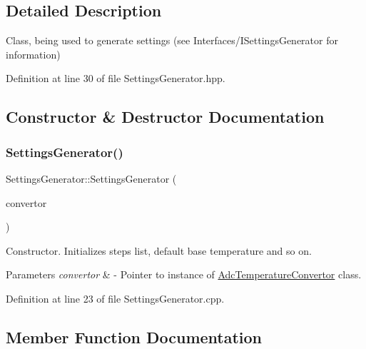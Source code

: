 \subsection{Detailed Description}
Class, being used to generate settings (see Interfaces/\+I\+Settings\+Generator for information) 

Definition at line 30 of file Settings\+Generator.\+hpp.



\subsection{Constructor \& Destructor Documentation}
\mbox{\label{class_settings_generator_a063e189547011b62a567ff55446341d7}} 
\subsubsection{\texorpdfstring{Settings\+Generator()}{SettingsGenerator()}}
{\footnotesize\ttfamily Settings\+Generator\+::\+Settings\+Generator (\begin{DoxyParamCaption}\item[{\hyperlink{class_interfaces_1_1_i_adc_temperature_convertor}{Interfaces\+::\+I\+Adc\+Temperature\+Convertor} $\ast$}]{convertor }\end{DoxyParamCaption})}



Constructor. Initializes steps list, default base temperature and so on. 


\begin{DoxyParams}{Parameters}
{\em convertor} & -\/ Pointer to instance of \hyperlink{class_adc_temperature_convertor}{Adc\+Temperature\+Convertor} class. \\
\hline
\end{DoxyParams}


Definition at line 23 of file Settings\+Generator.\+cpp.



\subsection{Member Function Documentation}
\mbox{\label{class_settings_generator_a99bbe6e67e638ccc7bf6b21b3bc36135}} 
